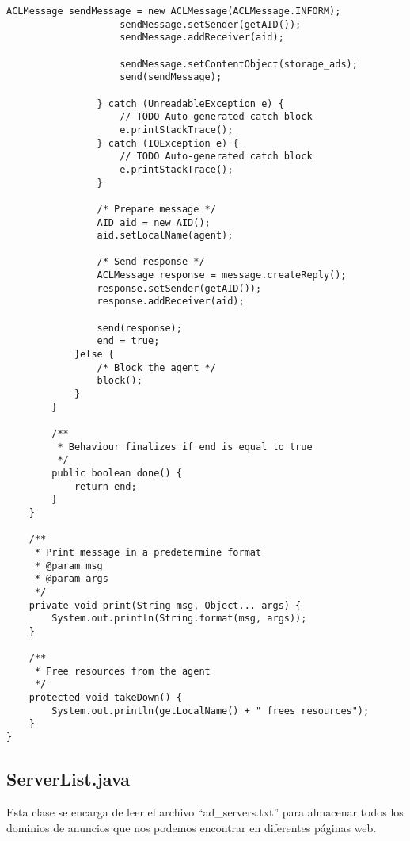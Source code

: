 \documentclass{pre-tfg}
\begin{document}
\begin{lstlisting}[caption=Código de extracción de anuncios de varios links de una URL,style=java]
					ACLMessage sendMessage = new ACLMessage(ACLMessage.INFORM);
					sendMessage.setSender(getAID());
					sendMessage.addReceiver(aid);

					sendMessage.setContentObject(storage_ads);
					send(sendMessage);

				} catch (UnreadableException e) {
					// TODO Auto-generated catch block
					e.printStackTrace();
				} catch (IOException e) {
					// TODO Auto-generated catch block
					e.printStackTrace();
				}

				/* Prepare message */
				AID aid = new AID();
				aid.setLocalName(agent);

				/* Send response */
				ACLMessage response = message.createReply();
				response.setSender(getAID());
				response.addReceiver(aid);

				send(response);
				end = true;
			}else {
				/* Block the agent */
				block();
			}
		}

		/**
		 * Behaviour finalizes if end is equal to true
		 */
		public boolean done() {
			return end;
		}
	}
	
	/**
	 * Print message in a predetermine format
	 * @param msg
	 * @param args
	 */
	private void print(String msg, Object... args) {
		System.out.println(String.format(msg, args));
	}

	/**
	 * Free resources from the agent
	 */
	protected void takeDown() {
		System.out.println(getLocalName() + " frees resources");
	}
}
\end{lstlisting}

\subsection{ServerList.java}

Esta clase se encarga de leer el archivo ``ad\_servers.txt'' para almacenar todos los dominios de anuncios que nos podemos encontrar
en diferentes páginas web.
\end{document}

